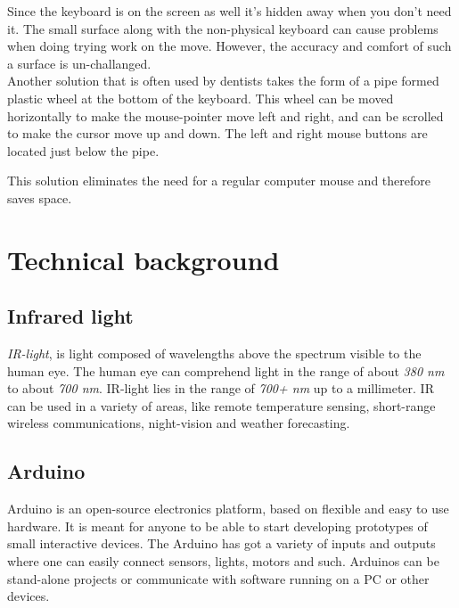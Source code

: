 Since the keyboard is on the screen as well it's hidden away when you don't need it.
The small surface along with the non-physical keyboard can cause problems when doing
trying work on the move. However, the accuracy and comfort of such a surface is un-challanged.\\
Another solution that is often used by dentists takes the form of a pipe formed plastic wheel
at the bottom of the keyboard. This wheel can be moved horizontally to make the mouse-pointer move
left and right, and can be scrolled to make the cursor move up and down. The left and right mouse
buttons are located just below the pipe.

This solution eliminates the need for a regular computer mouse and therefore saves space.\\

\section{Technical background}

\subsection{Infrared light}

\emph{IR-light}, is light composed of wavelengths above the spectrum visible to
the human eye. The human eye can comprehend light in the range of about \emph{380 nm} to about
\emph{700 nm}. IR-light lies in the range of \emph{700+ nm} up to a millimeter.
IR can be used in a variety of areas, like remote temperature sensing, short-range wireless
communications, night-vision and weather forecasting.

\subsection{Arduino}
Arduino is an open-source electronics platform, based on flexible and easy to use hardware.
It is meant for anyone to be able to start developing prototypes of small interactive devices.
The Arduino has got a variety of inputs and outputs where one can easily connect sensors, 
lights, motors and such. Arduinos can be stand-alone projects or communicate with 
software running on a PC or other devices.

